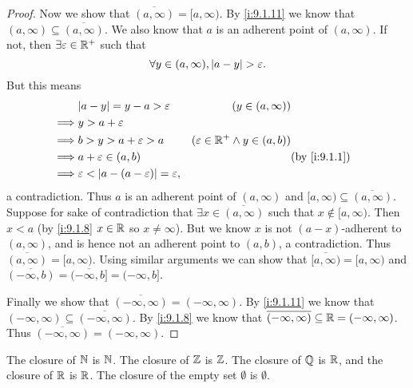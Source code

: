\begin{proof}
  Now we show that \(\overline{(a, \infty)} = [a, \infty)\).
  By \cref{i:9.1.11} we know that \((a, \infty) \subseteq \overline{(a, \infty)}\).
  We also know that \(a\) is an adherent point of \((a, \infty)\).
  If not, then \(\exists \varepsilon \in \mathbb{R}^+\) such that
  \[
    \forall y \in (a, \infty), \left\lvert a - y\right\rvert > \varepsilon.
  \]
  But this means
  \begin{align}
             & \abs{a - y} = y - a > \varepsilon                        & (y \in (a, \infty))                                      \\
    \implies & y > a + \varepsilon                                                                                                 \\
    \implies & b > y > a + \varepsilon > a                              & (\varepsilon \in \R^+ \land y \in (a, b))                \\
    \implies & a + \varepsilon \in (a, b)                               &                                           & \by{i:9.1.1} \\
    \implies & \varepsilon < \abs{a - (a - \varepsilon)} = \varepsilon,
  \end{align}
  a contradiction.
  Thus \(a\) is an adherent point of \((a, \infty)\) and \([a, \infty) \subseteq \overline{(a, \infty)}\).
  Suppose for sake of contradiction that \(\exists x \in \overline{(a, \infty)}\) such that \(x \notin [a, \infty)\).
  Then \(x < a\) (by \cref{i:9.1.8} \(x \in \mathbb{R}\) so \(x \neq \infty\)).
  But we know \(x\) is not \((a - x)\)-adherent to \((a, \infty)\), and is hence not an adherent point to \((a, b)\), a contradiction.
  Thus \(\overline{(a, \infty)} = [a, \infty)\).
  Using similar arguments we can show that \(\overline{[a, \infty)} = [a, \infty)\) and \(\overline{(-\infty, b)} = \overline{(-\infty, b]} = (-\infty, b]\).

  Finally we show that \(\overline{(-\infty, \infty)} = (-\infty, \infty)\).
  By \cref{i:9.1.11} we know that \((-\infty, \infty) \subseteq \overline{(-\infty, \infty)}\).
  By \cref{i:9.1.8} we know that \(\overline{(-\infty, \infty)} \subseteq \mathbb{R} = (-\infty, \infty)\).
  Thus \(\overline{(-\infty, \infty)} = (-\infty, \infty)\).
\end{proof}

\begin{lem}\label{i:9.1.13}
  The closure of \(\mathbb{N}\) is \(\mathbb{N}\).
  The closure of \(\mathbb{Z}\) is \(\mathbb{Z}\).
  The closure of \(\mathbb{Q}\) is \(\mathbb{R}\), and the closure of \(\mathbb{R}\) is \(\mathbb{R}\).
  The closure of the empty set \(\emptyset\) is \(\emptyset\).
\end{lem}

